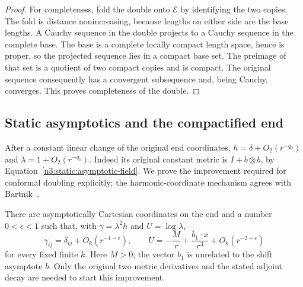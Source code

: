 \begin{proof}
For completeness, fold the double onto $\overline{\mathcal E}$ by
identifying the two copies. The fold is distance nonincreasing,
because lengths on either side are the base lengths. A Cauchy
sequence in the double projects to a Cauchy sequence in the complete
base. The base is a complete locally compact length space, hence is
proper, so the projected sequence lies in a compact base set. The
preimage of that set is a quotient of two compact copies and is
compact. The original sequence consequently has a convergent
subsequence and, being Cauchy, converges. This proves completeness
of the double.
\end{proof}

\subsection{Static asymptotics and the compactified end}
\label{n3:static:asymptotic-subsection}

After a constant linear change of the original end coordinates,
\(h=\delta+O_2(r^{-q_0})\) and
\(\lambda=1+O_2(r^{-q_0})\).
Indeed its original constant metric is
\(I+b\otimes b\), by Equation~\eqref{n3:static:asymptotic-field}.
We prove the improvement required for conformal doubling explicitly;
the harmonic-coordinate mechanism agrees with
Bartnik~\cite[Theorem 3.1, Proposition 3.3, and Theorem 4.3]{Bartnik1986}.

\begin{lemma}
\label{n3:static:asymptotics}
There are asymptotically Cartesian coordinates on the end and a
number \(0<\epsilon<1\) such that, with
\(\gamma=\lambda^2h\) and \(U=\log\lambda\),
\begin{equation}
\label{n3:static:gamma-expansion}
\gamma_{ij}=\delta_{ij}+O_k(r^{-1-\epsilon}),\qquad
U=-\frac Mr+\frac{b_1\cdot x}{r^3}
       +O_k(r^{-2-\epsilon})
\end{equation}
for every fixed finite \(k\).
Here \(M>0\); the vector \(b_1\) is unrelated to the shift asymptote
\(b\).
Only the original two metric derivatives and the stated adjoint
decay are needed to start this improvement.
\end{lemma}

